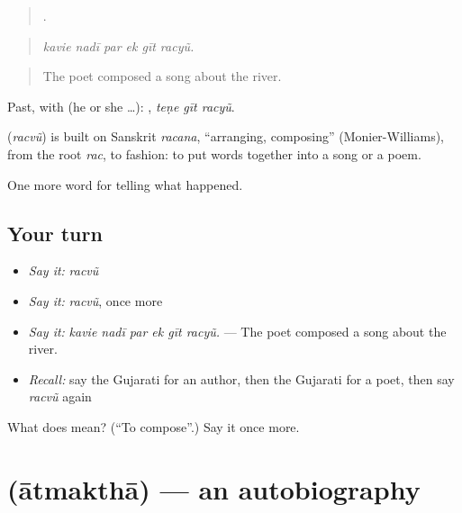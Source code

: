 \begin{quote}
     .
\end{quote}

\begin{quote}
\emph{kavie nadī par ek gīt racyũ.}
\end{quote}

\begin{quote}
The poet composed a song about the river.
\end{quote}

Past, with  (he or she …):   , \emph{teṇe gīt racyũ}.

\begin{cousinweb}
\textbf{} (\emph{racvũ}) is built on Sanskrit \emph{racana}, \textquotedblleft{}arranging, composing\textquotedblright{} (Monier-Williams), from the root \emph{rac}, to fashion: to put words together into a song or a poem.
\end{cousinweb}

\begin{grammarlens}[title={What you've built}]
One more word for telling what happened.
\end{grammarlens}

\subsection*{Your turn}
\begin{itemize}
\raggedright
  \item \emph{Say it:} \emph{racvũ}
  \item \emph{Say it:} \emph{racvũ}, once more
  \item \emph{Say it:} \emph{kavie nadī par ek gīt racyũ.} — The poet composed a song about the river.
  \item \emph{Recall:} say the Gujarati for an author, then the Gujarati for a poet, then say \emph{racvũ} again
\end{itemize}

\begin{tcolorbox}[breakable,colback=teal!4,colframe=teal!35!black,title={Before you move on}]
What does  mean? (\textquotedblleft{}To compose\textquotedblright{}.) Say it once more.
\end{tcolorbox}
\section[\texorpdfstring{\gu{આત્મકથા} (ātmakthā)}{આત્મકથા (ātmakthā)}]{ (ātmakthā) — an autobiography}

